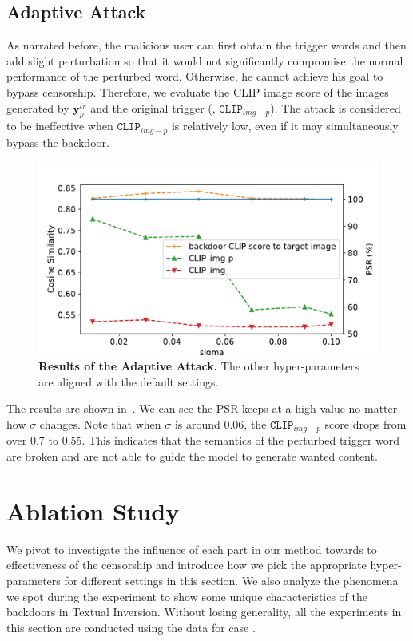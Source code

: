 \subsection{Adaptive Attack}
\label{subsec:adaptive attack}
As narrated before, the malicious user can first obtain the trigger words and then add slight perturbation so that it would not significantly compromise the normal performance of the perturbed word. Otherwise, he cannot achieve his goal to bypass censorship. Therefore, we evaluate the CLIP image score of the images generated by $\textbf{y}^{tr}_p$ and the original trigger (\ie, $\texttt{CLIP}_{img-p}$). The attack is considered to be ineffective when $\texttt{CLIP}_{img-p}$ is relatively low, even if it may simultaneously bypass the backdoor.

\begin{figure}[t]
    \centering 
    \includegraphics[width=0.95\linewidth]{images/PSR_perturb_trigger.pdf}
    \caption{\textbf{Results of the Adaptive Attack.} The other hyper-parameters are aligned with the default settings.}
            \vspace{-1em}
    \label{fig:perturb_trigger}
\end{figure}

The results are shown in~. We can see the PSR keeps at a high value no matter how $\sigma$ changes. Note that when $\sigma$ is around 0.06, the $\texttt{CLIP}_{img-p}$ score drops from over 0.7 to 0.55. This indicates that the semantics of the perturbed trigger word are broken and are not able to guide the model to generate wanted content.


\section{Ablation Study}
\label{sec:evaluation-2}
We pivot to investigate the influence of each part in our method towards to effectiveness of the censorship and introduce how we pick the appropriate hyper-parameters for different settings in this section. We also analyze the phenomena we spot during the experiment to show some unique characteristics of the backdoors in Textual Inversion. Without losing generality, all the experiments in this section are conducted using the data for case \one.  

